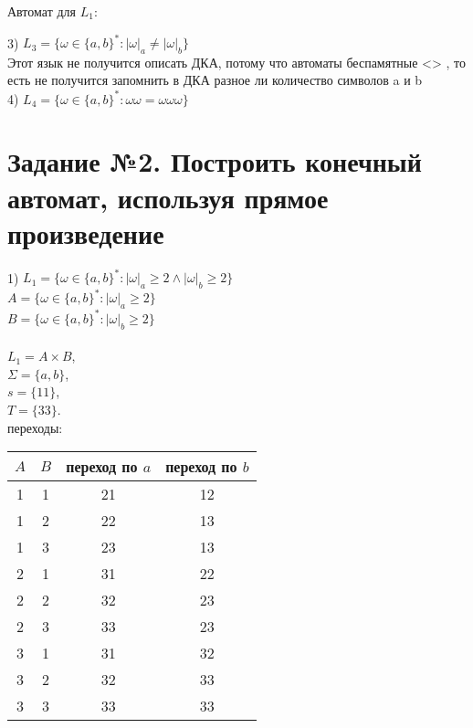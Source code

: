 \documentclass[a4paper,12pt]{article}
\begin{document}
 Автомат для $L_1$:
 





3) $L_3=\{\omega\in\{a,b\}^*:|\omega|_a \neq |\omega|_b \} $ \\

Этот язык не получится описать ДКА, потому что автоматы беспамятные <> , то есть не получится запомнить в ДКА разное ли количество символов a и b \\


4)  $L_4=\{\omega\in\{a,b\}^* : \omega \omega = \omega \omega \omega \} $ \\
        







\section{ Задание №2. Построить конечный автомат, используя прямое произведение}

1) $ L_1=\{\omega\in\{a,b\}^* : |\omega|_a \geqslant 2 \wedge |\omega|_b \geqslant 2 \} $ \\

$A=\{\omega\in\{a,b\}^* : |\omega|_a \geqslant 2 \} $ \\
$B=\{\omega\in\{a,b\}^* : |\omega|_b \geqslant 2 \} $ \\

\\
 

$L_1=A \times B$, \\
$\Sigma=\{a,b\}$, \\
$s=\{11\}$, \\
$T=\{33\}$. \\
переходы:\\
\begin{center}
    \begin{tabular}{ |c|c|c|c| } 
        \hline
        $A$ & $B$ & переход по $a$ & переход по $b$ \\
        \hline
        1 & 1 & 21 & 12 \\
        \hline
        1 & 2 & 22 & 13 \\
        \hline
        1 & 3 & 23 & 13 \\
        \hline
        2 & 1 & 31 & 22 \\
        \hline
        2 & 2 & 32 & 23 \\
        \hline
        2 & 3 & 33 & 23 \\
        \hline
        3 & 1 & 31 & 32 \\
        \hline
        3 & 2 & 32 & 33 \\
        \hline
        3 & 3 & 33 & 33 \\
        \hline
    \end{tabular}
\end{center}
\end{document}
